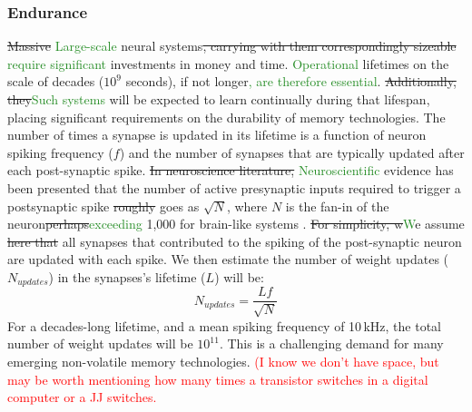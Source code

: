 \documentclass[twocolumn]{article}
\begin{document}
\subsubsection{Endurance}
\sout{Massive} \textcolor{ForestGreen}{Large-scale} neural systems\sout{, carrying with them correspondingly sizeable} \textcolor{ForestGreen}{require significant} investments in money and time. \textcolor{ForestGreen}{Operational} lifetimes on the scale of decades ($10^9$ seconds), if not longer\textcolor{ForestGreen}{, are therefore essential}. \sout{Additionally, they}\textcolor{ForestGreen}{Such systems} will be expected to learn continually during that lifespan, placing significant requirements on the durability of memory technologies. The number of times a synapse is updated in its lifetime is a function of neuron spiking frequency ($f$) and the number of synapses that are typically updated after each post-synaptic spike. \sout{In neuroscience literature,} \textcolor{ForestGreen}{Neuroscientific} evidence has been presented that the number of active presynaptic inputs required to trigger a postsynaptic spike \sout{roughly} goes as $\sqrt{N}$, where $N$ is the fan-in of the neuron\textemdash \sout{perhaps}\textcolor{ForestGreen}{exceeding} 1,000 for brain-like systems \cite{vrso1996,vora2005}. \sout{For simplicity, w}\textcolor{ForestGreen}{W}e assume \sout{here that} all synapses that contributed to the spiking of the post-synaptic neuron are updated with each spike. We then estimate the number of weight updates ($N_{updates}$) in the synapses's lifetime ($L$) will be:
\begin{equation}
    N_{updates} = \frac{Lf}{\sqrt{N}}
\end{equation}
For a decades-long lifetime, and a mean spiking frequency of 10\,kHz, the total number of weight updates will be $10^{11}$. This is a challenging demand for many emerging non-volatile memory technologies. \textcolor{red}{(I know we don't have space, but may be worth mentioning how many times a transistor switches in a digital computer or a JJ switches.}
\end{document}
